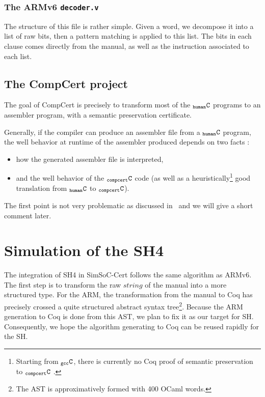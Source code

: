 \documentclass[a4paper, 11pt]{article}
\newcommand{\C}{$_{\tt compcert}{\tt C}$\xspace}
\newcommand{\gccC}{$_{\tt gcc}{\tt C}$\xspace}
\newcommand{\hC}{$_{\tt human}{\tt C}$\xspace}
\newcommand{\SScert}{SimSoC-Cert\xspace}
\begin{document}
\subsubsection{The ARMv6 {\tt decoder.v}}
The structure of this file is rather simple. Given a word, we decompose it into a list of raw bits, then a pattern matching is applied to this list. The bits in each clause comes directly from the manual, as well as the instruction associated to each list.
\subsection{The CompCert project}
The goal of CompCert is precisely to transform most of the \hC programs to an assembler program, with a semantic preservation certificate. 

Generally, if the compiler can produce an assembler file from a \hC program, the well behavior at runtime of the assembler produced depends on two facts :
\begin{itemize}
\item how the generated assembler file is interpreted,
\item and the well behavior of the \C code (as well as a heuristically\footnote{Starting from \gccC, there is currently no Coq proof of semantic preservation to \C%
. } good translation from \hC to \C).
\end{itemize}
The first point is not very problematic as discussed in~\cite{Leroy-Compcert-CACM} and we will give a short comment later.

\section{Simulation of the SH4}
\label{s:simu_sh4}

The integration of SH4 in \SScert follows the same algorithm as ARMv6. The first step is to transform the raw $string$ of the manual into a more structured type. For the ARM, the transformation from the manual to Coq has precisely crossed a quite structured abstract syntax tree\footnote{The AST is approximatively formed with 400 OCaml words.}. Because the ARM generation to Coq is done from this AST, we plan to fix it as our target for SH. Consequently, we hope the algorithm generating to Coq can be reused rapidly for the SH.

\hspace{1ex}
\end{document}
